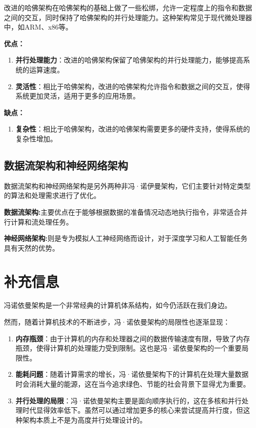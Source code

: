\documentclass[12pt]{article} %
\theoremstyle{definition}
\begin{document}
改进的哈佛架构在哈佛架构的基础上做了一些松绑，允许一定程度上的指令和数据之间的交互，同时保持了哈佛架构的并行处理能力。这种架构常见于现代微处理器中，如ARM、x86等\cite{HarvardArchitecture, Pawson2022MythHarvard}。

\textbf{优点：}
\begin{enumerate}
  \item \textbf{并行处理能力}：改进的哈佛架构保留了哈佛架构的并行处理能力，能够提高系统的运算速度。
  \item \textbf{灵活性}：相比于哈佛架构，改进的哈佛架构允许指令和数据之间的交互，使得系统更加灵活，适用于更多的应用场景。
\end{enumerate}

\textbf{缺点：}
\begin{enumerate}
  \item \textbf{复杂性}：相比于哈佛架构，改进的哈佛架构需要更多的硬件支持，使得系统的复杂性增加。
\end{enumerate}

\subsection{数据流架构和神经网络架构}

数据流架构和神经网络架构是另外两种非冯·诺伊曼架构，它们主要针对特定类型的算法和处理需求进行了优化\cite{Siriwardhane2020ComputerArchitecture}。

\textbf{数据流架构:}主要优点在于能够根据数据的准备情况动态地执行指令，非常适合并行计算和流处理任务。

\textbf{神经网络架构:}则是专为模拟人工神经网络而设计，对于深度学习和人工智能任务具有天然的优势。

\section{补充信息}

冯诺依曼架构是一个非常经典的计算机体系结构，如今仍活跃在我们身边。

然而，随着计算机技术的不断进步，冯·诺依曼架构的局限性也逐渐显现：

\begin{enumerate}
  \item \textbf{内存瓶颈}：由于计算机的内存和处理器之间的数据传输速度有限，导致了内存瓶颈，使得计算机的处理能力受到限制。这也是冯·诺依曼架构的一个重要局限性。
  \item \textbf{能耗问题}：随着计算需求的增长，冯·诺依曼架构下的计算机在处理大量数据时会消耗大量的能源，这在当今追求绿色、节能的社会背景下显得尤为重要。
  \item \textbf{并行处理的局限}：冯·诺依曼架构主要是面向顺序执行的，这在多核和并行处理时代显得效率低下。虽然可以通过增加更多的核心来尝试提高并行度，但这种架构本质上不是为高度并行处理设计的。
\end{enumerate}
\end{document}
